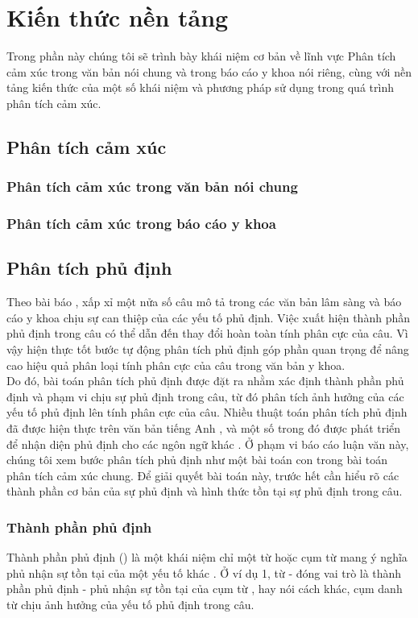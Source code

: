 \section{Kiến thức nền tảng}
Trong phần này chúng tôi sẽ trình bày khái niệm cơ bản về lĩnh vực Phân tích cảm xúc trong văn bản nói chung và trong báo cáo y khoa nói riêng, cùng với nền tảng kiến thức của một số khái niệm và phương pháp sử dụng trong quá trình phân tích cảm xúc.
\subsection{Phân tích cảm xúc}
\subsubsection*{Phân tích cảm xúc trong văn bản nói chung}
\subsubsection*{Phân tích cảm xúc trong báo cáo y khoa}
\subsection{Phân tích phủ định}
Theo bài báo \cite{chapman2001evaluation}, xấp xỉ một nửa số câu mô tả trong các văn bản lâm sàng và báo cáo y khoa chịu sự can thiệp của các yếu tố phủ định. Việc xuất hiện thành phần phủ định trong câu có thể dẫn đến thay đổi hoàn toàn tính phân cực của câu. Vì vậy hiện thực tốt bước tự động phân tích phủ định góp phần quan trọng để nâng cao hiệu quả phân loại tính phân cực của câu trong văn bản y khoa.\\

Do đó, bài toán phân tích phủ định được đặt ra nhằm xác định thành phần phủ định và phạm vi chịu sự phủ định trong câu, từ đó phân tích ảnh hưởng của các yếu tố phủ định lên tính phân cực của câu. Nhiều thuật toán phân tích phủ định đã được hiện thực trên văn bản tiếng Anh \cite{Aronow1999, chapman2001evaluation, Mutalik2001, Elkin2005, Zeng2007}, và một số trong đó được phát triển để nhận diện phủ định cho các ngôn ngữ khác \cite{benamara2012how, costumero2014an, Chapman2013, CruzDiaz2015, gindl2006negation}. Ở phạm vi báo cáo luận văn này, chúng tôi xem bước phân tích phủ định như một bài toán con trong bài toán phân tích cảm xúc chung. Để giải quyết bài toán này, trước hết cần hiểu rõ các thành phần cơ bản của sự phủ định và hình thức tồn tại sự phủ định trong câu.

\subsubsection*{Thành phần phủ định}
Thành phần phủ định () là một khái niệm chỉ một từ hoặc cụm từ mang ý nghĩa phủ nhận sự tồn tại của một yếu tố khác \cite{skeppstedt2016marker}. Ở ví dụ 1, từ  - đóng vai trò là thành phần phủ định - phủ nhận sự tồn tại của cụm từ , hay nói cách khác, cụm danh từ  chịu ảnh hưởng của yếu tố phủ định trong câu. \\

